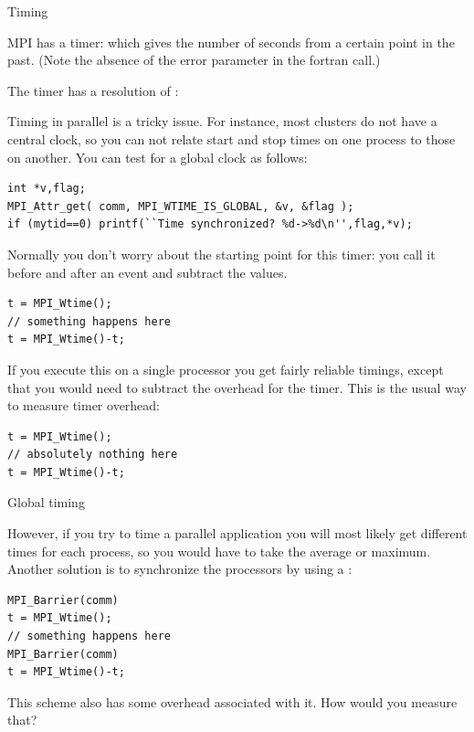 

 {Timing}
\label{sec:mpi-timing}

MPI has a  timer: 
%
%
which gives the number of seconds from a certain point in the past.
(Note the absence of the error parameter in the fortran call.)
%

The timer has a resolution of :
%

Timing in parallel is a tricky issue. For instance, most clusters do
not have a central clock, so you can not relate start and stop times
on one process to those on another. You can test for a global clock as
follows:
\begin{lstlisting}
int *v,flag;
MPI_Attr_get( comm, MPI_WTIME_IS_GLOBAL, &v, &flag );
if (mytid==0) printf(``Time synchronized? %d->%d\n'',flag,*v);
\end{lstlisting}

Normally you don't worry about the starting point for this timer: 
you call it before and after an event and subtract the values.
\begin{lstlisting}
t = MPI_Wtime();
// something happens here
t = MPI_Wtime()-t;
\end{lstlisting}
If you execute this on a single processor you get fairly reliable
timings, except that you would need to subtract the overhead for the
timer. This is the usual way to measure timer overhead:
\begin{lstlisting}
t = MPI_Wtime();
// absolutely nothing here
t = MPI_Wtime()-t;
\end{lstlisting}

 {Global timing}

However, if you try to time a parallel application you will most likely
get different times for each process, so you would have to take the
average or maximum.  Another solution is to synchronize the processors
by using a :
\begin{lstlisting}
MPI_Barrier(comm)
t = MPI_Wtime();
// something happens here
MPI_Barrier(comm)
t = MPI_Wtime()-t;
\end{lstlisting}

\begin{exercise}
  This scheme also has some overhead associated with it. How would you measure that?
\end{exercise}

